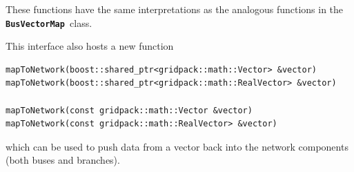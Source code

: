 These functions have the same interpretations as the analogous functions in the \texttt{\textbf{BusVectorMap }}class.

This interface also hosts a new function

{
\color{red}
\begin{Verbatim}[fontseries=b]
mapToNetwork(boost::shared_ptr<gridpack::math::Vector> &vector)
mapToNetwork(boost::shared_ptr<gridpack::math::RealVector> &vector)

mapToNetwork(const gridpack::math::Vector &vector)
mapToNetwork(const gridpack::math::RealVector> &vector)
\end{Verbatim}
}

which can be used to push data from a vector back into the network components (both buses and branches).
\newline
\hyperlink{topDoc}{\color{blue}{Top}}
